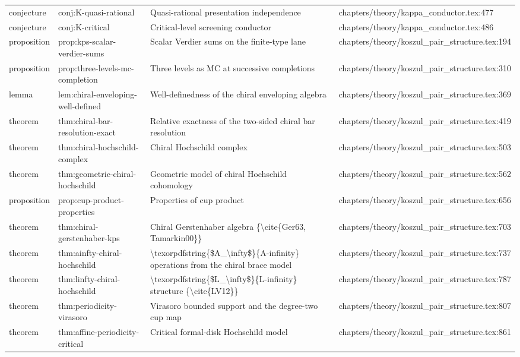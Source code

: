 \documentclass[11pt]{article}
\begin{document}
\begin{longtable}{L{0.10\textwidth}L{0.26\textwidth}L{0.42\textwidth}L{0.22\textwidth}}
conjecture & conj:K-quasi-rational & Quasi-rational presentation independence & chapters/theory/kappa\_conductor.tex:477\\
conjecture & conj:K-critical & Critical-level screening conductor & chapters/theory/kappa\_conductor.tex:486\\
proposition & prop:kps-scalar-verdier-sums & Scalar Verdier sums on the finite-type lane & chapters/theory/koszul\_pair\_structure.tex:194\\
proposition & prop:three-levels-mc-completion & Three levels as MC at successive completions & chapters/theory/koszul\_pair\_structure.tex:310\\
lemma & lem:chiral-enveloping-well-defined & Well-definedness of the chiral enveloping algebra & chapters/theory/koszul\_pair\_structure.tex:369\\
theorem & thm:chiral-bar-resolution-exact & Relative exactness of the two-sided chiral bar resolution & chapters/theory/koszul\_pair\_structure.tex:419\\
theorem & thm:chiral-hochschild-complex & Chiral Hochschild complex & chapters/theory/koszul\_pair\_structure.tex:503\\
theorem & thm:geometric-chiral-hochschild & Geometric model of chiral Hochschild cohomology & chapters/theory/koszul\_pair\_structure.tex:562\\
proposition & prop:cup-product-properties & Properties of cup product & chapters/theory/koszul\_pair\_structure.tex:656\\
theorem & thm:chiral-gerstenhaber-kps & Chiral Gerstenhaber algebra \{\textbackslash{}cite\{Ger63, Tamarkin00\}\} & chapters/theory/koszul\_pair\_structure.tex:703\\
theorem & thm:ainfty-chiral-hochschild & \textbackslash{}texorpdfstring\{\$A\_\textbackslash{}infty\$\}\{A-infinity\} operations from the chiral brace model & chapters/theory/koszul\_pair\_structure.tex:737\\
theorem & thm:linfty-chiral-hochschild & \textbackslash{}texorpdfstring\{\$L\_\textbackslash{}infty\$\}\{L-infinity\} structure \{\textbackslash{}cite\{LV12\}\} & chapters/theory/koszul\_pair\_structure.tex:787\\
theorem & thm:periodicity-virasoro & Virasoro bounded support and the degree-two cup map & chapters/theory/koszul\_pair\_structure.tex:807\\
theorem & thm:affine-periodicity-critical & Critical formal-disk Hochschild model & chapters/theory/koszul\_pair\_structure.tex:861\\

\end{longtable}
\end{document}
